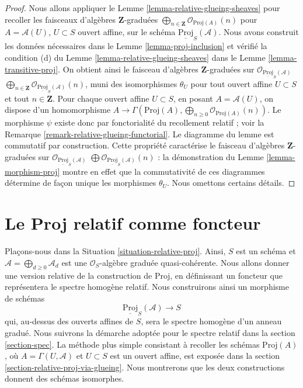 \begin{proof}
Nous allons appliquer le Lemme \ref{lemma-relative-glueing-sheaves} pour
recoller les faisceaux d'algèbres $\mathbf{Z}$-graduées
$\bigoplus_{n \in \mathbf{Z}} \mathcal{O}_{\text{Proj}(A)}(n)$ pour
$A = \mathcal{A}(U)$, $U \subset S$ ouvert affine, sur le schéma
$\underline{\text{Proj}}_S(\mathcal{A})$.
Nous avons construit les données nécessaires dans le
Lemme \ref{lemma-proj-inclusion} et vérifié la condition (d) du
Lemme \ref{lemma-relative-glueing-sheaves} dans le
Lemme \ref{lemma-transitive-proj}. On obtient ainsi
le faisceau d'algèbres $\mathbf{Z}$-graduées sur
$\mathcal{O}_{\underline{\text{Proj}}_S(\mathcal{A})}$
$\bigoplus_{n \in \mathbf{Z}}
\mathcal{O}_{\underline{\text{Proj}}_S(\mathcal{A})}(n)$,
muni des isomorphismes $\theta_U$ pour tout ouvert affine $U \subset S$
et tout $n \in \mathbf{Z}$. Pour chaque ouvert affine $U \subset S$,
en posant $A = \mathcal{A}(U)$, on dispose d'un homomorphisme
$A \to \Gamma(\text{Proj}(A),
\bigoplus_{n \geq 0} \mathcal{O}_{\text{Proj}(A)}(n))$.
Le morphisme $\psi$ existe donc par fonctorialité du recollement relatif ;
voir la Remarque \ref{remark-relative-glueing-functorial}.
Le diagramme du lemme est commutatif par construction. Cette propriété
caractérise le faisceau d'algèbres $\mathbf{Z}$-graduées sur
$\mathcal{O}_{\underline{\text{Proj}}_S(\mathcal{A})}$
$\bigoplus \mathcal{O}_{\underline{\text{Proj}}_S(\mathcal{A})}(n)$ :
la démonstration du Lemme \ref{lemma-morphism-proj} montre en effet que la
commutativité de ces diagrammes détermine de façon unique les morphismes
$\theta_U$. Nous omettons certains détails.
\end{proof}















\section{Le Proj relatif comme foncteur}
\label{section-relative-proj}

\noindent
Plaçons-nous dans la Situation \ref{situation-relative-proj}.
Ainsi, $S$ est un schéma et
$\mathcal{A} = \bigoplus_{d \geq 0} \mathcal{A}_d$ est une
$\mathcal{O}_S$-algèbre graduée quasi-cohérente. Nous allons donner une
version relative de la construction de $\text{Proj}$, en définissant un
foncteur que représentera le spectre homogène relatif. Nous construirons
ainsi un morphisme de schémas
$$
\underline{\text{Proj}}_S(\mathcal{A}) \longrightarrow S
$$
qui, au-dessus des ouverts affines de $S$, sera le spectre homogène d'un
anneau gradué. Nous suivrons la démarche adoptée pour le spectre relatif
dans la section \ref{section-spec}. La méthode plus simple consistant à
recoller les schémas $\text{Proj}(A)$, où $A = \Gamma(U, \mathcal{A})$ et
$U \subset S$ est un ouvert affine, est exposée dans la
section \ref{section-relative-proj-via-glueing}. Nous montrerons que les
deux constructions donnent des schémas isomorphes.

